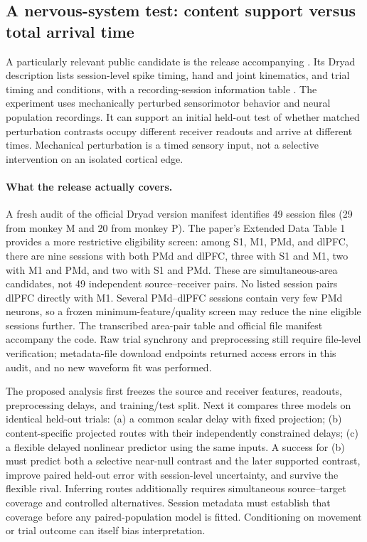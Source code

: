 \subsection{A nervous-system test: content support versus total arrival time}\label{sec:nervous-test}
A particularly relevant public candidate is the release accompanying \citet{michaels2025}. Its Dryad description lists session-level spike timing, hand and joint kinematics, and trial timing and conditions, with a recording-session information table \citep{michaelsdata2025}. The experiment uses mechanically perturbed sensorimotor behavior and neural population recordings. It can support an initial held-out test of whether matched perturbation contrasts occupy different receiver readouts and arrive at different times. Mechanical perturbation is a timed sensory input, not a selective intervention on an isolated cortical edge.

\paragraph{What the release actually covers.} A fresh audit of the official Dryad version manifest identifies 49 session files (29 from monkey M and 20 from monkey P). The paper's Extended Data Table 1 provides a more restrictive eligibility screen: among S1, M1, PMd, and dlPFC, there are nine sessions with both PMd and dlPFC, three with S1 and M1, two with M1 and PMd, and two with S1 and PMd. These are simultaneous-area candidates, not 49 independent source--receiver pairs. No listed session pairs dlPFC directly with M1. Several PMd--dlPFC sessions contain very few PMd neurons, so a frozen minimum-feature/quality screen may reduce the nine eligible sessions further. The transcribed area-pair table and official file manifest accompany the code. Raw trial synchrony and preprocessing still require file-level verification; metadata-file download endpoints returned access errors in this audit, and no new waveform fit was performed.

The proposed analysis first freezes the source and receiver features, readouts, preprocessing delays, and training/test split. Next it compares three models on identical held-out trials: (a) a common scalar delay with fixed projection; (b) content-specific projected routes with their independently constrained delays; (c) a flexible delayed nonlinear predictor using the same inputs. A success for (b) must predict both a selective near-null contrast and the later supported contrast, improve paired held-out error with session-level uncertainty, and survive the flexible rival. Inferring routes additionally requires simultaneous source--target coverage and controlled alternatives. Session metadata must establish that coverage before any paired-population model is fitted. Conditioning on movement or trial outcome can itself bias interpretation.

